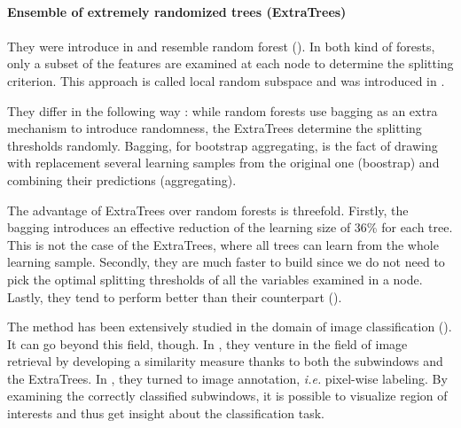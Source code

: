 \documentclass[a4paper]{report}
\begin{document}
\begin{leftbar}
	\paragraph{Ensemble of extremely randomized trees (ExtraTrees)}
	\paragraph{}
	They were introduce in \cite{extratrees} and resemble random forest (\cite{randomforests}). In both kind of forests, only a subset of the features are examined at each node to determine the splitting criterion. This approach is called local random subspace and was introduced in \cite{randomsubspace}. 
	\par
	They differ in the following way : while random forests use bagging as an extra mechanism to introduce randomness, the ExtraTrees determine the splitting thresholds randomly. Bagging, for bootstrap aggregating, is the fact of drawing with replacement several learning samples from the original one (boostrap) and combining their predictions (aggregating). 
	\par
	The advantage of ExtraTrees over random forests is threefold. Firstly, the bagging introduces an effective reduction of the learning size of 36\% for each tree. This is not the case of the ExtraTrees, where all trees can learn from the whole learning sample. Secondly, they are much faster to build since we do not need to pick the optimal splitting thresholds of all the variables examined in a node. Lastly, they tend to perform better than their counterpart (\cite{extratrees}).
\end{leftbar}
The method has been extensively studied in the domain of image classification (\cite{base}). It can go beyond this field, though. In \cite{PixitImgRetrieval}, they venture in the field of image retrieval by developing a similarity measure thanks to both the subwindows and the ExtraTrees. In \cite{PixitLabeling}, they turned to image annotation, \textit{i.e.} pixel-wise labeling. By examining the correctly classified subwindows, it is possible to visualize region of interests and thus get insight about the classification task.
\end{document}
